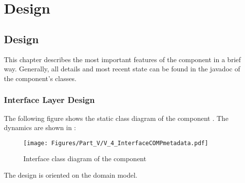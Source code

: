 
\chapter{\SUBSHighLevel{} Design}
\label{sec:SUBSHighLeveldes}


\section{\COMPmetadata{} Design}
\label{sec:COMPmetadataImplementationDesign}

This chapter describes the most important features of the \COMPmetadata{} component in a brief way. Generally, all details and most recent state can be found in the javadoc of the component's classes.


\subsection{Interface Layer Design}
\label{sec:InterfaceDesignCOMPmetadata}

The following figure shows the static class diagram of the component \COMPmetadata{}. The dynamics are shown in :

\begin{figure}[H]
	\centering
	\texttt{[image: Figures/Part\_V/V\_4\_InterfaceCOMPmetadata.pdf]}
	\caption{Interface class diagram of the component \COMPmetadata{}}
	\label{fig:V_4_InterfaceCOMPmetadata}
\end{figure}

The design is oriented on the domain model.


